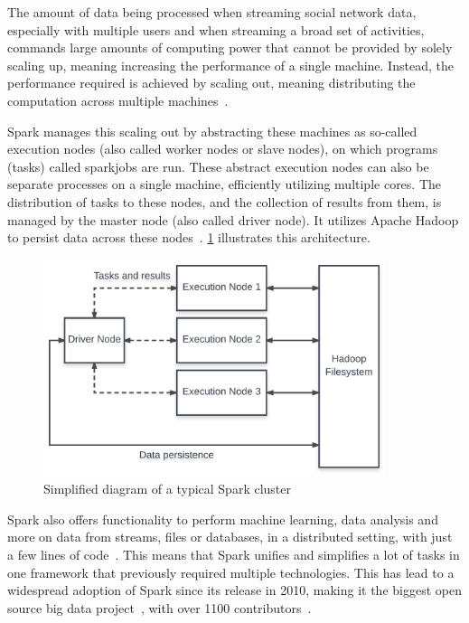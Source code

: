 The amount of data being processed when streaming social network data,
especially with multiple users and when streaming a broad set of activities,
commands large amounts of computing power that cannot be provided by solely scaling up,
meaning increasing the performance of a single machine.
Instead, the performance required is achieved by scaling out,
meaning distributing the computation across multiple machines~\cite{Wolke2010}.
\par %
Spark manages this scaling out by abstracting these machines as so-called execution nodes (also called worker nodes or slave nodes),
on which programs (tasks) called sparkjobs are run.
These abstract execution nodes can also be separate processes on a single machine,
efficiently utilizing multiple cores. %
The distribution of tasks to these nodes, and the collection of results from them,
is managed by the master node (also called driver node).
It utilizes Apache Hadoop to persist data across these nodes~\cite{Zaharia2016}.
\ref{fig:spark} illustrates this architecture.

\begin{figure}
    \centering
    \caption{Simplified diagram of a typical Spark cluster}
    \label{fig:spark}
    \includegraphics[width=10cm]{../figures/spark.pdf}
\end{figure}

\par
Spark also offers functionality to perform machine learning, data analysis and more on data from streams,
files or databases, in a distributed setting, with just a few lines of code~\cite{sparkDocs}.
This means that Spark unifies and simplifies a lot of tasks in one framework that previously required multiple technologies.
This has lead to a widespread adoption of Spark since its release in 2010,
making it the biggest open source big data project~\cite{Zaharia2016}, with over 1100 contributors~\cite{sparkContributor}.

